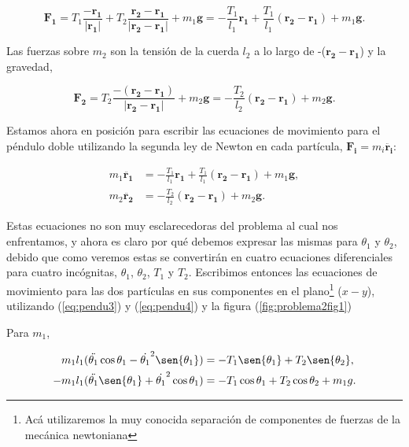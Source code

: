 \documentclass[a4paper,10pt]{article}
\numberwithin{equation}{section}
\begin{document}
\begin{equation}
 \mathbf{F_1} = T_1 \frac{-\mathbf{r_1}}{|\mathbf{r_1}|} + T_2 \frac{\mathbf{r_2} - \mathbf{r_1}}{|\mathbf{r_2} -\mathbf{r_1}|}
	      + m_1 \mathbf{g} = - \frac{T_1}{l_1} \mathbf{r_1} + \frac{T_1}{l_1} (\mathbf{r_2} - \mathbf{r_1}) + m_1 \mathbf{g}.
\end{equation}

Las fuerzas sobre $m_2$ son la tensión de la cuerda $l_2$ a lo largo de -($\mathbf{r_2} - \mathbf{r_1}$)
y la gravedad,

\begin{equation}
 \mathbf{F_2} = T_2 \frac{-(\mathbf{r_2} - \mathbf{r_1})}{|\mathbf{r_2} -\mathbf{r_1}|}
	      + m_2 \mathbf{g} = - \frac{T_2}{l_2} (\mathbf{r_2} -\mathbf{r_1}) + m_2 \mathbf{g}.
\end{equation}

Estamos ahora en posición para escribir las ecuaciones de movimiento para el péndulo 
doble utilizando la segunda ley de Newton en cada partícula, $\mathbf{F_i} = m_i \ddot{\mathbf{r_i}}$:

\begin{align}
 m_1 \ddot{\mathbf{r_1}} &= - \frac{T_1}{l_1} \mathbf{r_1} + \frac{T_1}{l_1} (\mathbf{r_2} - \mathbf{r_1}) + m_1 \mathbf{g}, \\
 m_2 \ddot{\mathbf{r_2}} &= - \frac{T_2}{l_2} (\mathbf{r_2} -\mathbf{r_1}) + m_2 \mathbf{g}.
\end{align}

Estas ecuaciones no son muy esclarecedoras del problema al cual nos enfrentamos, y ahora 
es claro por qué debemos expresar las mismas para $\theta_1$ y $\theta_2$, debido que como 
veremos estas se convertirán en cuatro ecuaciones diferenciales para cuatro incógnitas, 
$\theta_1$, $\theta_2$, $T_1$ y $T_2$. Escribimos entonces las ecuaciones de movimiento 
para las dos partículas en sus componentes en el plano\footnote{Acá utilizaremos la muy conocida separación
de componentes de fuerzas de la mecánica newtoniana} ($x-y$), utilizando (\ref{eq:pendu3}) y (\ref{eq:pendu4}) y 
la figura (\ref{fig:problema2fig1})

\vspace{.3cm}

Para $m_1$,

\begin{align}
 m_1 l_1 (\ddot{\theta_1}\cos{\theta_1} - \dot{\theta_1}^2\sen{\theta_1}) &= - T_1 \sen{\theta_1} + T_2 \sen{\theta_2}, \\
 -m_1 l_1 (\ddot{\theta_1}\sen{\theta_1} + \dot{\theta_1}^2\cos{\theta_1}) &= - T_1 \cos{\theta_1} + T_2 \cos{\theta_2} + m_1 g.
\end{align}
\end{document}
